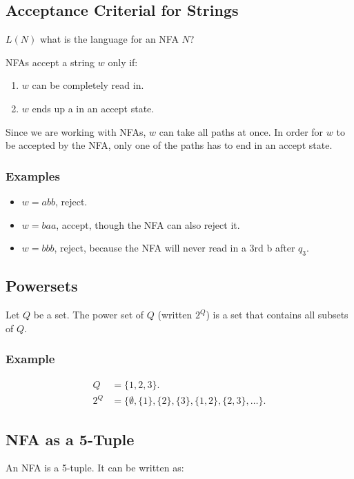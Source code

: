 \documentclass[12pt]{article}
\begin{document}
\subsection*{Acceptance Criterial for Strings}
$L(N)$ what is the language for an NFA $N$?

NFAs accept a string $w$ only if:
\begin{enumerate}
    \item $w$ can be completely read in.
    \item $w$ ends up a in an accept state.
\end{enumerate}
Since we are working with NFAs, $w$ can take all paths at once. 
In order for $w$ to be accepted by the NFA, only one of the paths
has to end in an accept state.

\subsubsection*{Examples}

\begin{itemize}
    \item $w = abb$, reject.
    \item $w = baa$, accept, though the NFA can also reject it.
    \item $w = bbb$, reject, because the NFA will never read in
                     a 3rd b after $q_3$.
\end{itemize}

\subsection*{Powersets}

Let $Q$ be a set.
The power set of $Q$ (written $2^Q$) is a set that contains
all subsets of $Q$.

\subsubsection*{Example}
\begin{align*}
    Q &= \{1, 2, 3\}.\\
  2^Q &= \{ \emptyset, \{1\}, \{2\}, \{3\}, \{1,2\}, \{2,3\}, \ldots \}.
\end{align*}

\subsection*{NFA as a 5-Tuple}
An NFA is a 5-tuple. It can be written as:
\end{document}
